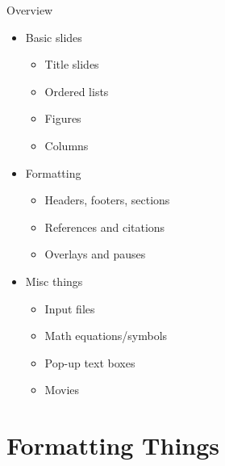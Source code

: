\documentclass[11pt,mathserif]{beamer} %
\begin{document}
\begin{frame}[t]{Overview} %
	\begin{itemize} %
		\item Basic slides %
		\begin{itemize} %
			\item Title slides %
			\item Ordered lists
			\item Figures
			\item Columns
		\end{itemize} %
\vspace{0.1in} %
		\item Formatting %
		\begin{itemize} %
			\item Headers, footers, sections
			\item References and citations
			\item Overlays and pauses
		\end{itemize}
\vspace{0.1in}
		\item Misc things
		\begin{itemize}
			\item Input files
			\item Math equations/symbols
			\item Pop-up text boxes
			\item Movies
		\end{itemize}
	\end{itemize}
\end{frame}


\section{Formatting Things}



\end{document}
